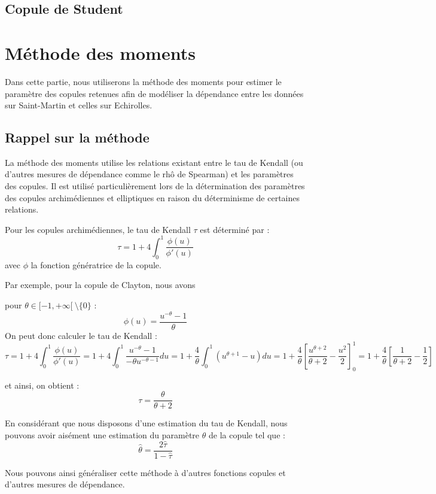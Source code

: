 \subsection{Copule de Student}

\section{Méthode des moments}

Dans cette partie, nous utiliserons la méthode des moments pour estimer le paramètre des copules retenues afin de modéliser la dépendance entre les données sur Saint-Martin et celles sur Echirolles.

\subsection{Rappel sur la méthode}

La méthode des moments utilise les relations existant entre le tau de Kendall (ou d'autres mesures de dépendance comme le rhô de Spearman) et les paramètres des
copules. Il est utilisé particulièrement lors de la détermination des paramètres des copules archimédiennes
et elliptiques en raison du déterminisme de certaines relations.

Pour les copules archimédiennes, le tau de Kendall $\tau$ est déterminé par :
$$
\tau = 1 + 4 \int_0^1 \frac{\phi(u)}{\phi'(u)}
$$
avec $\phi$ la fonction génératrice de la copule.

Par exemple, pour la copule de Clayton, nous avons 

pour $\theta \in [-1,+\infty[ ~\setminus \{0\}$ :
$$
\phi (u) = \frac{u^{-\theta}-1}{\theta}
$$
On peut donc calculer le tau de Kendall :
$$
\tau = 1 + 4 \int_0^1 \frac{\phi(u)}{\phi'(u)} = 1 + 4 \int_0^1 \frac{u^{-\theta} - 1}{-\theta u^{-\theta -1}} du = 1 + \frac{4}{\theta} \int_0^1 (u^{\theta + 1}-u) du
= 1 + \frac{4}{\theta} \left [  \frac{u^{\theta +2}}{\theta +2} - \frac{u^2}{2} \right ]_0^1 = 1 +\frac{4}{\theta} \left [ \frac{1}{\theta + 2} - \frac{1}{2}\right ]
$$

et ainsi, on obtient : 
$$
\tau = \frac{\theta}{\theta + 2}
$$

En considérant que nous disposons d'une estimation du tau de Kendall, nous pouvons avoir aisément une estimation du paramètre $\theta$ de la copule tel que :
$$
\widehat{\theta} = \frac{2 \widehat{\tau}}{1 - \widehat{\tau}}
$$

Nous pouvons ainsi généraliser cette méthode à d’autres fonctions copules et d’autres mesures de dépendance.


